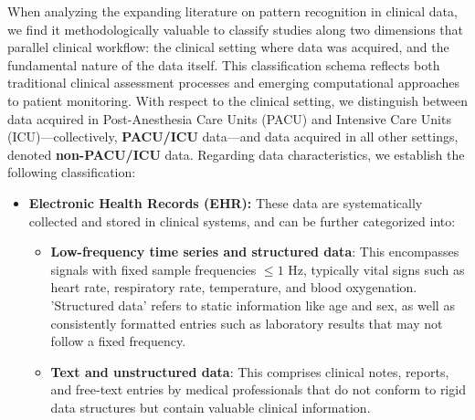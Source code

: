 When analyzing the expanding literature on pattern recognition in clinical data, we find it methodologically valuable to classify studies along two dimensions that parallel clinical workflow: the clinical setting where data was acquired, and the fundamental nature of the data itself. This classification schema reflects both traditional clinical assessment processes and emerging computational approaches to patient monitoring.
With respect to the clinical setting, we distinguish between data acquired in Post-Anesthesia Care Units (PACU) and Intensive Care Units (ICU)---collectively, \textbf{PACU/ICU} data---and data acquired in all other settings, denoted \textbf{non-PACU/ICU} data.
Regarding data characteristics, we establish the following classification:
\begin{itemize}
  \item \textbf{Electronic Health Records (EHR):} These data are systematically collected and stored in clinical systems, and can be further categorized into:
        \begin{itemize}
          \item \textbf{Low-frequency time series and structured data}: This encompasses signals with fixed sample frequencies $\leq 1$ Hz, typically vital signs such as heart rate, respiratory rate, temperature, and blood oxygenation. 'Structured data' refers to static information like age and sex, as well as consistently formatted entries such as laboratory results that may not follow a fixed frequency.
          \item \textbf{Text and unstructured data}: This comprises clinical notes, reports, and free-text entries by medical professionals that do not conform to rigid data structures but contain valuable clinical information.
        \end{itemize}


\end{itemize}
